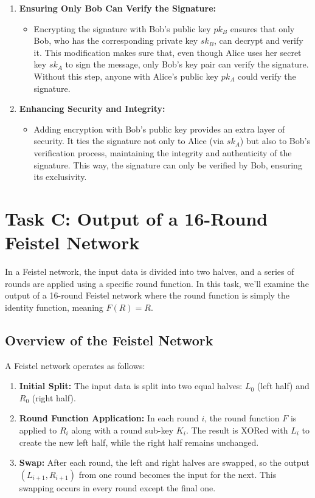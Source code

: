 \documentclass[12pt]{article}
\begin{document}
\begin{enumerate}
    \item \textbf{Ensuring Only Bob Can Verify the Signature:}
    \begin{itemize}
        \item Encrypting the signature with Bob’s public key \( pk_B \) ensures that only Bob, who has the corresponding private key \( sk_B \), can decrypt and verify it. This modification makes sure that, even though Alice uses her secret key \( sk_A \) to sign the message, only Bob’s key pair can verify the signature. Without this step, anyone with Alice’s public key \( pk_A \) could verify the signature.
    \end{itemize}
    
    \item \textbf{Enhancing Security and Integrity:}
    \begin{itemize}
        \item Adding encryption with Bob’s public key provides an extra layer of security. It ties the signature not only to Alice (via \( sk_A \)) but also to Bob’s verification process, maintaining the integrity and authenticity of the signature. This way, the signature can only be verified by Bob, ensuring its exclusivity.
    \end{itemize}
    
\end{enumerate}

\section{Task C: Output of a 16-Round Feistel Network}

In a Feistel network, the input data is divided into two halves, and a series of rounds are applied using a specific round function. In this task, we'll examine the output of a 16-round Feistel network where the round function is simply the identity function, meaning \( F(R) = R \).

\subsection*{Overview of the Feistel Network}

A Feistel network operates as follows:

\begin{enumerate}
    \item \textbf{Initial Split:} The input data is split into two equal halves: \( L_0 \) (left half) and \( R_0 \) (right half).
    \item \textbf{Round Function Application:} In each round \( i \), the round function \( F \) is applied to \( R_i \) along with a round sub-key \( K_i \). The result is XORed with \( L_i \) to create the new left half, while the right half remains unchanged.
    \item \textbf{Swap:} After each round, the left and right halves are swapped, so the output \( (L_{i+1}, R_{i+1}) \) from one round becomes the input for the next. This swapping occurs in every round except the final one.
\end{enumerate}
\end{document}
